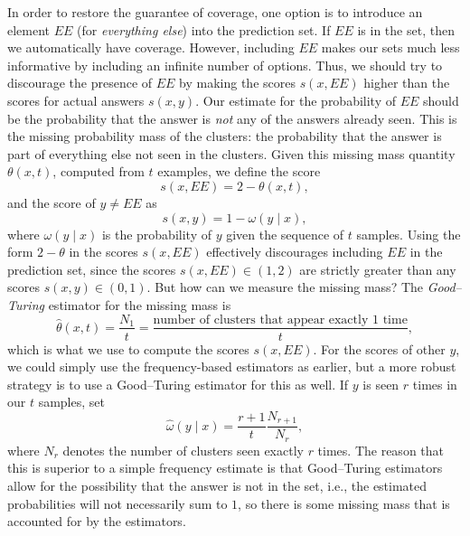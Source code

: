 \documentclass{scrartcl}
\begin{document}
In order to restore the guarantee of coverage, one option is to introduce an element $EE$ (for \emph{everything else})
into the prediction set. If $EE$ is in the set, then we automatically have coverage.
However, including $EE$ makes our sets much less informative by including an infinite number of options.
Thus, we should try to discourage the presence of $EE$ by making the scores $s(x, EE)$
higher than the scores for actual answers $s(x, y)$.
Our estimate for the probability of $EE$ should be the probability that the answer is \emph{not} any of the answers already seen.
This is the missing probability mass of the clusters: the probability that the answer
is part of everything else not seen in the clusters.
Given this missing mass quantity $\theta(x, t)$, computed from $t$ examples, we define the score
\[ s(x, EE) = 2 - \theta(x, t) , \]
and the score of $y \neq EE$ as
\[ s(x, y) = 1 - \omega(y \mid  x) , \]
where $\omega(y \mid x)$ is the probability of $y$ given the sequence of $t$ samples.
Using the form $2 - \theta$ in the scores $s(x, EE)$ effectively discourages including $EE$ in the prediction set,
since the scores $s(x, EE) \in (1, 2)$ are strictly greater than any scores $s(x, y) \in (0, 1)$.
But how can we measure the missing mass? The \emph{Good--Turing} estimator for the missing mass is
\[ \hat{\theta}(x, t) = \frac{N_1}{t} = \frac{\text{number of clusters that appear exactly $1$ time}}{t} , \]
which is what we use to compute the scores $s(x, EE)$. For the scores of other $y$, we could simply use the frequency-based estimators as earlier, but a more robust strategy is to use a Good--Turing estimator for this as well. If $y$ is seen $r$ times in our $t$ samples, set
\[ \hat{\omega}(y \mid x)  = \frac{r + 1}{t} \frac{N_{r + 1}}{N_r} , \]
where $N_r$ denotes the number of clusters seen exactly $r$ times.
The reason that this is superior to a simple frequency estimate
is that Good--Turing estimators allow for the possibility that the answer is not in the set,
i.e., the estimated probabilities
will not necessarily sum to $1$, so there is some missing mass that is accounted for by the estimators. \medskip
\end{document}
